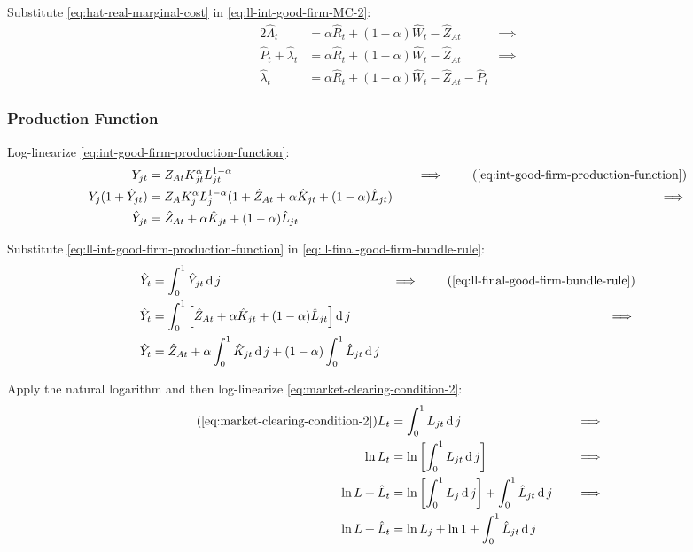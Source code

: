 \documentclass[
	thesis.tex
	]{subfiles}
\begin{document}
Substitute \ref{eq:hat-real-marginal-cost} in \ref{eq:ll-int-good-firm-MC-2}:
\begin{alignat}{2}
	\hat{\Lambda}_t &= \alpha \hat{R}_t + (1- \alpha) \hat{W}_t - \hat{Z}_{At} &\implies \nonumber \\
	\hat{P}_t + \hat{\lambda}_t &= \alpha \hat{R}_t + (1- \alpha) \hat{W}_t - \hat{Z}_{At} &\implies \nonumber \\
	\hat{\lambda}_t &= \alpha \hat{R}_t + (1- \alpha) \hat{W}_t - \hat{Z}_{At} - \hat{P}_t \label{eq:ll-int-good-firm-MC-3}
\end{alignat}


\subsubsection{Production Function}

Log-linearize \ref{eq:int-good-firm-production-function}:
\begin{alignat}{2}
	Y_{jt} &= Z_{At} K_{jt}^\alpha L_{jt}^{1-\alpha} &\implies \tag{\ref{eq:int-good-firm-production-function}} \\
	Y_{j} (1+ \hat{Y}_{jt}) &= Z_{A} K_{j}^\alpha L_{j}^{1-\alpha} (1+ \hat{Z}_{At} + \alpha \hat{K}_{jt} + (1-\alpha) \hat{L}_{jt}) \quad &\implies \nonumber \\
	\hat{Y}_{jt} &= \hat{Z}_{At} + \alpha \hat{K}_{jt} + (1-\alpha) \hat{L}_{jt} \label{eq:ll-int-good-firm-production-function}
\end{alignat}

Substitute \ref{eq:ll-int-good-firm-production-function} in \ref{eq:ll-final-good-firm-bundle-rule}:
\begin{alignat}{2}
	\hat{Y}_t &= \int_{0}^{1} \hat{Y}_{jt} \dif j &\implies \tag{\ref{eq:ll-final-good-firm-bundle-rule}} \\
	\hat{Y}_t &= \int_{0}^{1} \left[ \hat{Z}_{At} + \alpha \hat{K}_{jt} + (1-\alpha) \hat{L}_{jt} \right] \dif j &\implies \nonumber \\
	\hat{Y}_t &= \hat{Z}_{At} + \alpha \int_{0}^{1} \hat{K}_{jt} \dif j + (1-\alpha) \int_{0}^{1} \hat{L}_{jt} \dif j \label{eq:ll-final-good-firm-bundle-rule-2}
\end{alignat}

Apply the natural logarithm and then log-linearize \ref{eq:market-clearing-condition-2}:
\begin{alignat}{2}
	\tag{\ref{eq:market-clearing-condition-2}}
	L_t &= \int_{0}^{1} L_{jt} \dif j &\implies \\
	\ln L_t &= \ln \left[ \int_{0}^{1} L_{jt} \dif j \right] &\implies \nonumber \\
	\ln L + \hat{L}_t &= \ln \left[ \int_{0}^{1} L_{j} \dif j \right] + \int_{0}^{1} \hat{L}_{jt} \dif j \quad &\implies \nonumber \\
	\ln L + \hat{L}_t &= \ln L_{j} + \ln 1 + \int_{0}^{1} \hat{L}_{jt} \dif j \nonumber
\end{alignat}
\end{document}
